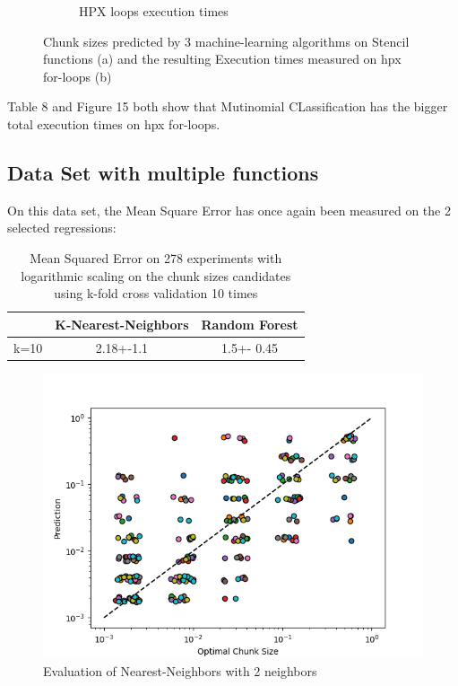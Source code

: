 \begin{figure}[h]
\begin{subfigure}[b]{0.49\textwidth}
		\caption[]%
		{{HPX loops execution times}}    
	\end{subfigure}
	\caption{Chunk sizes predicted by 3 machine-learning algorithms on Stencil functions (a) and the resulting Execution times measured on hpx for-loops (b)} 
\end{figure}

Table 8 and Figure 15 both show that Mutinomial CLassification has the bigger total execution times on hpx for-loops.
\subsection{Data Set with multiple functions}

On this data set, the Mean Square Error has once again been measured on the 2 selected regressions:

\begin{table}[h]
	\centering
	\caption{Mean Squared Error on 278 experiments with logarithmic scaling on the chunk sizes candidates using k-fold cross validation 10 times}
	\label{my-label}
	\begin{tabular}{|c|c|c|}
		\hline
		& K-Nearest-Neighbors & Random Forest \\ \hline
		k=10  & 2.18+-1.1        & 1.5+- 0.45 \\ \hline
	\end{tabular}
\end{table}
\begin{figure}[H]
	\centering
	\includegraphics[width=120mm]{images/KNNR_eval_big.png}
	\caption{Evaluation of Nearest-Neighbors with 2 neighbors}
\end{figure}

